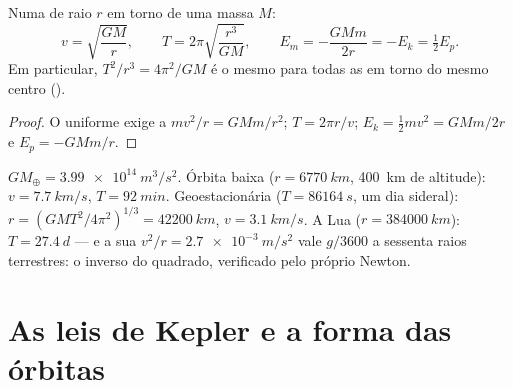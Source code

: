 \begin{theorem}\label{thm:b1:central-forces:circular}
Numa  de raio $r$ em torno de uma massa $M$:
\[
v = \sqrt{\frac{GM}{r}}, \qquad
T = 2\pi\sqrt{\frac{r^3}{GM}}, \qquad
E_m = -\frac{GMm}{2r} = -E_k = \tfrac12 E_p .
\]
Em particular, $T^2/r^3 = 4\pi^2/GM$ é o mesmo para todas as 
em torno do mesmo centro ().
\end{theorem}

\begin{proof}
O  uniforme exige a  $mv^2/r = GMm/r^2$;
$T = 2\pi r/v$; $E_k = \tfrac12 mv^2 = GMm/2r$ e $E_p = -GMm/r$.
\end{proof}

\begin{example}\label{ex:b1:central-forces:orbits}
$GM_\oplus = \qty{3.99e14}{m^3/s^2}$. Órbita baixa ($r = \qty{6770}{km}$,
\qty{400}{km} de altitude): $v = \qty{7.7}{km/s}$, $T = \qty{92}{min}$. Geoestacionária
($T = \qty{86164}{s}$, um dia sideral): $r = (GMT^2/4\pi^2)^{1/3} =
\qty{42200}{km}$, $v = \qty{3.1}{km/s}$. A Lua ($r = \qty{384000}{km}$):
$T = \qty{27.4}{d}$ --- e a sua  $v^2/r =
\qty{2.7e-3}{m/s^2}$ vale $g/3600$ a sessenta raios terrestres: o inverso
do quadrado, verificado pelo próprio Newton.
\end{example}

\section{As leis de Kepler e a forma das órbitas}

